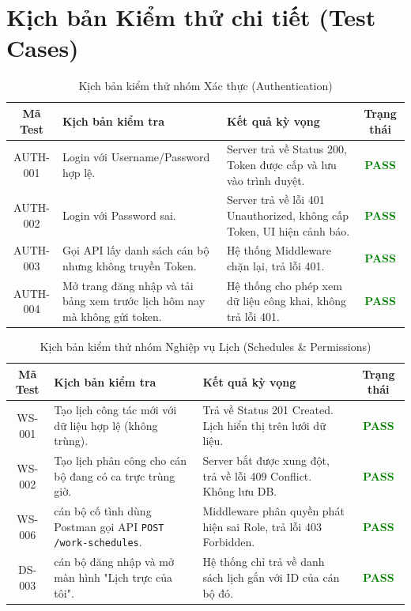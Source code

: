 \documentclass[18pt,a4paper]{report}
\begin{document}
\section{Kịch bản Kiểm thử chi tiết (Test Cases)}

\begin{table}[H]
\centering
\caption{Kịch bản kiểm thử nhóm Xác thực (Authentication)}
\begin{tabularx}{\textwidth}{|c|>{\raggedright\arraybackslash}p{4cm}|X|c|}
\hline
\textbf{Mã Test} & \textbf{Kịch bản kiểm tra} & \textbf{Kết quả kỳ vọng} & \textbf{Trạng thái} \\ \hline
AUTH-001 & Login với Username/Password hợp lệ. & Server trả về Status 200, Token được cấp và lưu vào trình duyệt. & \textcolor{green}{\textbf{PASS}} \\ \hline
AUTH-002 & Login với Password sai. & Server trả về lỗi 401 Unauthorized, không cấp Token, UI hiện cảnh báo. & \textcolor{green}{\textbf{PASS}} \\ \hline
AUTH-003 & Gọi API lấy danh sách cán bộ nhưng không truyền Token. & Hệ thống Middleware chặn lại, trả lỗi 401. & \textcolor{green}{\textbf{PASS}} \\ \hline
AUTH-004 & Mở trang đăng nhập và tải bảng xem trước lịch hôm nay mà không gửi token. & Hệ thống cho phép xem dữ liệu công khai, không trả lỗi 401. & \textcolor{green}{\textbf{PASS}} \\ \hline
\end{tabularx}
\end{table}

\begin{table}[H]
\centering
\caption{Kịch bản kiểm thử nhóm Nghiệp vụ Lịch (Schedules \& Permissions)}
\begin{tabularx}{\textwidth}{|c|>{\raggedright\arraybackslash}p{4cm}|X|c|}
\hline
\textbf{Mã Test} & \textbf{Kịch bản kiểm tra} & \textbf{Kết quả kỳ vọng} & \textbf{Trạng thái} \\ \hline
WS-001 & Tạo lịch công tác mới với dữ liệu hợp lệ (không trùng). & Trả về Status 201 Created. Lịch hiển thị trên lưới dữ liệu. & \textcolor{green}{\textbf{PASS}} \\ \hline
WS-002 & Tạo lịch phân công cho cán bộ đang có ca trực trùng giờ. & Server bắt được xung đột, trả về lỗi 409 Conflict. Không lưu DB. & \textcolor{green}{\textbf{PASS}} \\ \hline
WS-006 & cán bộ cố tình dùng Postman gọi API \texttt{POST /work-schedules}. & Middleware phân quyền phát hiện sai Role, trả lỗi 403 Forbidden. & \textcolor{green}{\textbf{PASS}} \\ \hline
DS-003 & cán bộ đăng nhập và mở màn hình "Lịch trực của tôi". & Hệ thống chỉ trả về danh sách lịch gắn với ID của cán bộ đó. & \textcolor{green}{\textbf{PASS}} \\ \hline
\end{tabularx}
\end{table}
\end{document}
